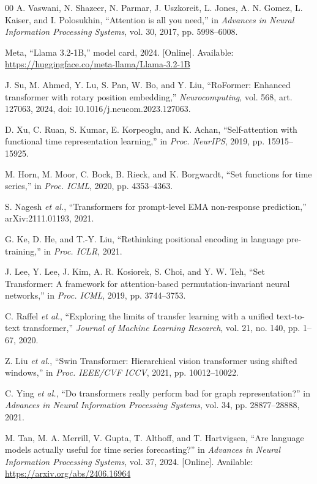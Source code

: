 \documentclass[conference]{IEEEtran}
\begin{document}
\begin{thebibliography}{00}
A. Vaswani, N. Shazeer, N. Parmar, J. Uszkoreit, L. Jones, A. N. Gomez,
L. Kaiser, and I. Polosukhin, ``Attention is all you need,'' in \emph{Advances
in Neural Information Processing Systems}, vol. 30, 2017, pp. 5998--6008.

Meta, ``Llama 3.2-1B,'' model card, 2024. [Online]. Available:
\url{https://huggingface.co/meta-llama/Llama-3.2-1B}

J. Su, M. Ahmed, Y. Lu, S. Pan, W. Bo, and Y. Liu, ``RoFormer: Enhanced
transformer with rotary position embedding,'' \emph{Neurocomputing}, vol. 568,
art. 127063, 2024, doi: 10.1016/j.neucom.2023.127063.

D. Xu, C. Ruan, S. Kumar, E. Korpeoglu, and K. Achan, ``Self-attention with
functional time representation learning,'' in \emph{Proc. NeurIPS}, 2019,
pp. 15915--15925.

M. Horn, M. Moor, C. Bock, B. Rieck, and K. Borgwardt, ``Set functions for
time series,'' in \emph{Proc. ICML}, 2020, pp. 4353--4363.

S. Nagesh \emph{et al.}, ``Transformers for prompt-level EMA non-response
prediction,'' arXiv:2111.01193, 2021.

G. Ke, D. He, and T.-Y. Liu, ``Rethinking positional encoding in language
pre-training,'' in \emph{Proc. ICLR}, 2021.

J. Lee, Y. Lee, J. Kim, A. R. Kosiorek, S. Choi, and Y. W. Teh, ``Set
Transformer: A framework for attention-based permutation-invariant neural
networks,'' in \emph{Proc. ICML}, 2019, pp. 3744--3753.


C. Raffel \emph{et al.}, ``Exploring the limits of transfer learning with a
unified text-to-text transformer,'' \emph{Journal of Machine Learning Research},
vol. 21, no. 140, pp. 1--67, 2020.

Z. Liu \emph{et al.}, ``Swin Transformer: Hierarchical vision transformer using
shifted windows,'' in \emph{Proc. IEEE/CVF ICCV}, 2021, pp. 10012--10022.

C. Ying \emph{et al.}, ``Do transformers really perform bad for graph
representation?'' in \emph{Advances in Neural Information Processing Systems},
vol. 34, pp. 28877--28888, 2021.


M. Tan, M. A. Merrill, V. Gupta, T. Althoff, and T. Hartvigsen,
``Are language models actually useful for time series forecasting?''
in \emph{Advances in Neural Information Processing Systems}, vol. 37, 2024.
[Online]. Available: \url{https://arxiv.org/abs/2406.16964}

\end{thebibliography}
\end{document}
